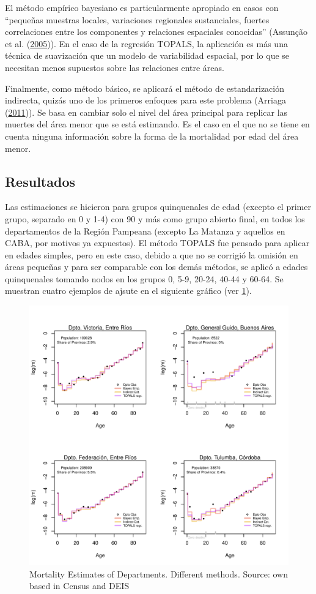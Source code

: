 \documentclass[12pt,]{article}
\begin{document}
El método empírico bayesiano es particularmente apropiado en casos con
``pequeñas muestras locales, variaciones regionales sustanciales,
fuertes correlaciones entre los componentes y relaciones espaciales
conocidas'' (Assunção et al.
(\protect\hyperlink{ref-Assuncao2005}{2005})). En el caso de la
regresión TOPALS, la aplicación es más una técnica de suavización que un
modelo de variabilidad espacial, por lo que se necesitan menos supuestos
sobre las relaciones entre áreas.

Finalmente, como método básico, se aplicará el método de estandarización
indirecta, quizás uno de los primeros enfoques para este problema
(Arriaga (\protect\hyperlink{ref-Arriaga2011}{2011})). Se basa en
cambiar solo el nivel del área principal para replicar las muertes del
área menor que se está estimando. Es el caso en el que no se tiene en
cuenta ninguna información sobre la forma de la mortalidad por edad del
área menor.

\hypertarget{resultados}{%
\subsection{\texorpdfstring{\textbf{Resultados}}{Resultados}}\label{resultados}}

Las estimaciones se hicieron para grupos quinquenales de edad (excepto
el primer grupo, separado en 0 y 1-4) con 90 y más como grupo abierto
final, en todos los departamentos de la Región Pampeana (excepto La
Matanza y aquellos en CABA, por motivos ya expuestos). El método TOPALS
fue pensado para aplicar en edades simples, pero en este caso, debido a
que no se corrigió la omisión en áreas pequeñas y para ser comparable
con los demás métodos, se aplicó a edades quinquenales tomando nodos en
los grupos 0, 5-9, 20-24, 40-44 y 60-64. Se muestran cuatro ejemplos de
ajsute en el siguiente gráfico (ver \ref{fig:Ajuste}).

\begin{figure}

{\centering \includegraphics[width=0.7\linewidth]{plots/Ajuste} 

}

\caption{Mortality Estimates of Departments. Different methods. Source: own based in Census and DEIS}\label{fig:Ajuste}
\end{figure}
\end{document}
